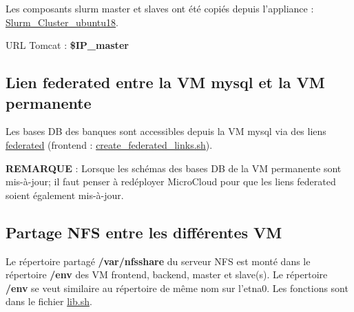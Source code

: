 Les composants slurm master et slaves ont été copiés depuis l'appliance :  \href{https://nuv.la/module/ifb/devzone/jlorenzo/cluster/Slurm_Cluster_ubuntu18}{Slurm\_Cluster\_ubuntu18}.

URL Tomcat : \textbf{\$IP\_master}

\subsection{Lien federated entre la VM mysql et  la VM permanente}
Les bases DB des banques sont accessibles depuis la VM mysql via des liens \href{https://dev.mysql.com/doc/refman/8.0/en/federated-storage-engine.html}{federated} (frontend : \href{https://github.com/IFB-ElixirFr/biosphere-microcloud/blob/master/frontend/create_federated_links.sh}{create\_federated\_links.sh}).\\

\begin{mycolorbox}\textbf{REMARQUE} : Lorsque les schémas des bases DB de la VM permanente sont mis-à-jour; il faut penser à redéployer MicroCloud pour que les liens federated soient également mis-à-jour.
\end{mycolorbox}

\subsection{Partage NFS entre les différentes VM}
Le répertoire partagé \textbf{/var/nfsshare} du serveur NFS est monté dans le répertoire \textbf{/env}
des VM frontend, backend, master et slave(s). Le répertoire \textbf{/env} se veut similaire au répertoire de même nom sur l’etna0. 
Les fonctions sont dans le fichier \href{https://github.com/IFB-ElixirFr/biosphere-microcloud/blob/master/lib.sh}{lib.sh}.